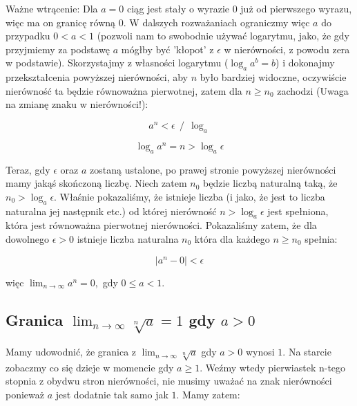 \documentclass[a4paper,oneside,openright,11pt]{article}
\numberwithin{equation}{section}
\begin{document}
\noindent
Ważne wtrącenie: Dla $a = 0$ ciąg jest stały o wyrazie $0$ już od pierwszego wyrazu, więc ma on granicę równą $0$. W dalszych rozważaniach ograniczmy więc $a$ do przypadku $0 < a < 1$ (pozwoli nam to swobodnie używać
logarytmu, jako, że gdy przyjmiemy za podstawę $a$ mógłby być 'kłopot' z $\epsilon$ w nierówności, z powodu zera w podstawie).
Skorzystajmy z własności logarytmu ($\log _{a} a^b = b$) i dokonajmy przekształcenia powyższej nierówności, aby $n$ było bardziej widoczne, oczywiście
nierówność ta będzie równoważna pierwotnej, zatem dla $n \geq n_0$ zachodzi (Uwaga na zmianę znaku w nierówności!):

\begin{equation*}
    a^{n}  < \epsilon \ \ / \ \ \log _{a}
\end{equation*}

\begin{equation*}
    \log _{a} a^{n} = n > \log _{a} \epsilon 
\end{equation*}

\noindent
Teraz, gdy $\epsilon$ oraz $a$ zostaną ustalone, po prawej stronie powyższej nierówności mamy jakąś skończoną liczbę.
Niech zatem $n_0$ będzie liczbą naturalną taką, że $n_0 > \log _{a} \epsilon$. Właśnie pokazaliśmy, że istnieje liczba (i jako, że jest to liczba naturalna jej następnik etc.) od której
nierówność $n > \log _{a} \epsilon$ jest spełniona, która jest równoważna pierwotnej nierówności. Pokazaliśmy zatem, że dla dowolnego $\epsilon > 0$ istnieje liczba naturalna $n_0$ która dla każdego $n \geq n_0$
spełnia:


\begin{equation*}
    |a^{n} - 0| < \epsilon
\end{equation*}

\vspace{10mm}


więc $\lim_{n\to\infty} a^{n} = 0,$ gdy $0 \leq a < 1$.


\subsection{Granica $\lim_{n\to\infty} \sqrt[n]{a} = 1$ gdy $a > 0$}

Mamy udowodnić, że granica z $\lim_{n\to\infty} \sqrt[n]{a}$ gdy $a > 0$ wynosi $1$. Na starcie zobaczmy co się dzieje w momencie
gdy $a \geq 1$. Weźmy wtedy pierwiastek n-tego stopnia z obydwu stron nierówności, nie musimy uważać na znak nierówności ponieważ $a$ jest dodatnie tak samo jak $1$.
Mamy zatem:
\end{document}
